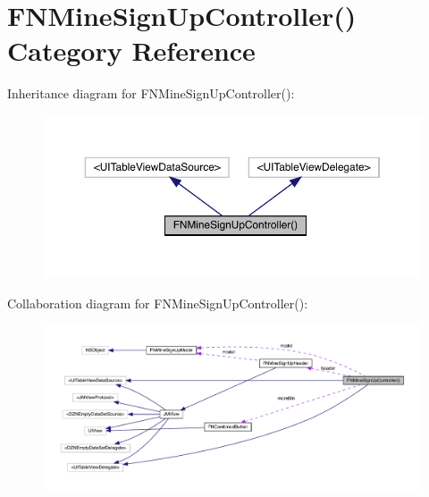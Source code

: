 \hypertarget{category_f_n_mine_sign_up_controller_07_08}{}\section{F\+N\+Mine\+Sign\+Up\+Controller() Category Reference}
\label{category_f_n_mine_sign_up_controller_07_08}


Inheritance diagram for F\+N\+Mine\+Sign\+Up\+Controller()\+:\nopagebreak
\begin{figure}[H]
\begin{center}
\leavevmode
\includegraphics[width=350pt]{category_f_n_mine_sign_up_controller_07_08__inherit__graph}
\end{center}
\end{figure}


Collaboration diagram for F\+N\+Mine\+Sign\+Up\+Controller()\+:\nopagebreak
\begin{figure}[H]
\begin{center}
\leavevmode
\includegraphics[width=350pt]{category_f_n_mine_sign_up_controller_07_08__coll__graph}
\end{center}
\end{figure}
